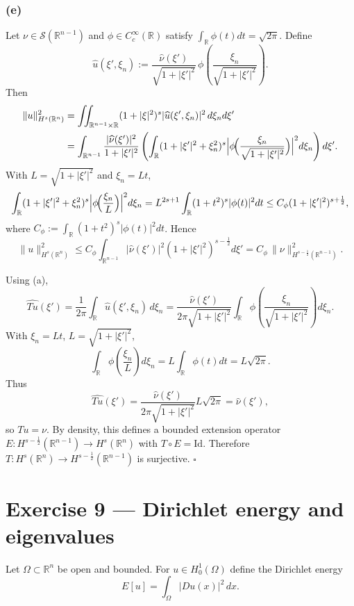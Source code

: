 \documentclass[12pt,a4paper]{article}
\newcommand{\qed}{\hfill$\square$}
\theoremstyle{plain}
\theoremstyle{definition}
\theoremstyle{remark}
\theoremstyle{remark}
\begin{document}
\subsubsection*{(e)}
Let $\nu\in\mathcal S(\mathbb R^{n-1})$ and $\phi\in C_c^\infty(\mathbb R)$ satisfy
$\int_{\mathbb R}\phi(t)dt=\sqrt{2\pi}$. Define
\[
\widehat u(\xi',\xi_n)
:=\frac{\widehat\nu(\xi')}{\sqrt{1+|\xi'|^2}}\,
\phi\!\left(\frac{\xi_n}{\sqrt{1+|\xi'|^2}}\right).
\]
Then
\[
\begin{aligned}
	\|u\|_{H^s(\mathbb R^n)}^2
	&= \iint_{\mathbb R^{n-1}\times\mathbb R}
	(1+|\xi|^2)^s |\widehat u(\xi',\xi_n)|^2\,d\xi_n d\xi'\\
	&= \int_{\mathbb R^{n-1}} \frac{|\widehat\nu(\xi')|^2}{1+|\xi'|^2}
	\left(\int_{\mathbb R}(1+|\xi'|^2+\xi_n^2)^s
	\Bigl|\phi\!\Bigl(\frac{\xi_n}{\sqrt{1+|\xi'|^2}}\Bigr)\Bigr|^2 d\xi_n\right)d\xi'.
\end{aligned}
\]
With $L=\sqrt{1+|\xi'|^2}$ and $\xi_n=Lt$,
\[
\int_{\mathbb R}(1+|\xi'|^2+\xi_n^2)^s
\Bigl|\phi\!\Bigl(\frac{\xi_n}{L}\Bigr)\Bigr|^2 d\xi_n
= L^{2s+1}\int_{\mathbb R}(1+t^2)^s|\phi(t)|^2 dt
\le C_\phi (1+|\xi'|^2)^{s+\frac12},
\]
where $C_\phi:=\int_{\mathbb R}(1+t^2)^s|\phi(t)|^2dt$.
Hence
\[
\|u\|_{H^s(\mathbb R^n)}^2
\le C_\phi \int_{\mathbb R^{n-1}}|\widehat\nu(\xi')|^2(1+|\xi'|^2)^{s-\frac12}d\xi'
= C_\phi\,\|\nu\|_{H^{s-\frac12}(\mathbb R^{n-1})}^2.
\]

Using (a),
\[
\widehat{Tu}(\xi')
= \frac{1}{2\pi}\int_{\mathbb R}\widehat u(\xi',\xi_n)\,d\xi_n
= \frac{\widehat\nu(\xi')}{2\pi\sqrt{1+|\xi'|^2}}
\int_{\mathbb R}\phi\!\left(\frac{\xi_n}{\sqrt{1+|\xi'|^2}}\right)d\xi_n.
\]
With $\xi_n=Lt$, $L=\sqrt{1+|\xi'|^2}$,
\[
\int_{\mathbb R}\phi\!\left(\frac{\xi_n}{L}\right)d\xi_n
= L\int_{\mathbb R}\phi(t)dt = L\sqrt{2\pi}.
\]
Thus
\[
\widehat{Tu}(\xi') = \frac{\widehat\nu(\xi')}{2\pi\sqrt{1+|\xi'|^2}}L\sqrt{2\pi}
= \widehat\nu(\xi'),
\]
so $Tu=\nu$.
By density, this defines a bounded extension operator
$E:H^{s-\frac12}(\mathbb R^{n-1})\to H^s(\mathbb R^n)$ with $T\circ E = \mathrm{Id}$.
Therefore $T:H^s(\mathbb R^n)\to H^{s-\frac12}(\mathbb R^{n-1})$ is surjective.
\qed

\section*{Exercise 9 — Dirichlet energy and eigenvalues}

Let $\Omega\subset\mathbb{R}^n$ be open and bounded. For $u\in H_0^1(\Omega)$
define the Dirichlet energy
\[
E[u] = \int_\Omega |Du(x)|^2\,dx.
\]
\end{document}
